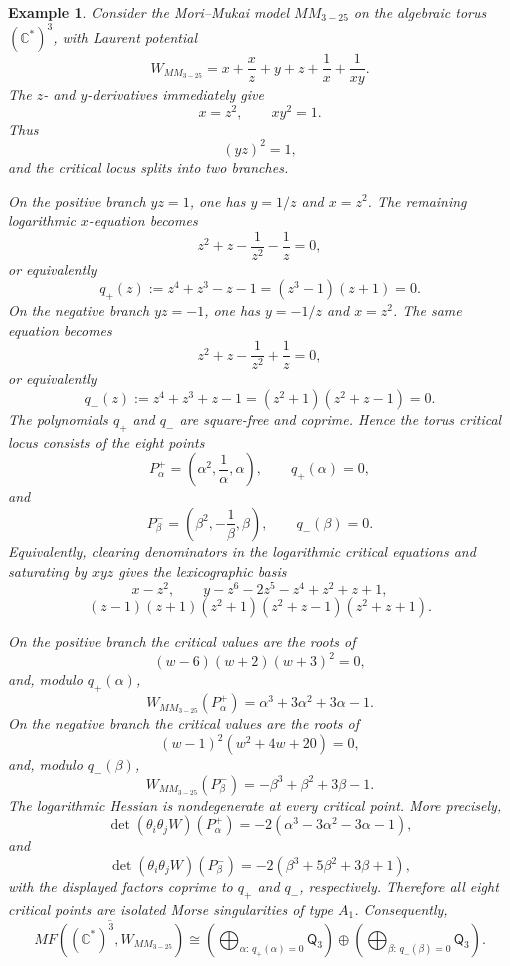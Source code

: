\documentclass[11pt]{amsart}
\newtheorem{example}{Example}[section]
\newcommand{\MorseCat}[1]{\mathsf{Q}_{#1}}
\begin{document}
\begin{example}
Consider the Mori--Mukai model $MM_{3-25}$ on the algebraic torus
$(\mathbb{C}^*)^3$, with Laurent potential
\[
W_{MM_{3-25}}=x+\frac{x}{z}+y+z+\frac{1}{x}+\frac{1}{xy}.
\]
The $z$- and $y$-derivatives immediately give
\[
x=z^2,
\qquad
xy^2=1.
\]
Thus
\[
(yz)^2=1,
\]
and the critical locus splits into two branches.

On the positive branch $yz=1$, one has $y=1/z$ and $x=z^2$. The remaining
logarithmic $x$-equation becomes
\[
z^2+z-\frac{1}{z^2}-\frac{1}{z}=0,
\]
or equivalently
\[
q_+(z):=z^4+z^3-z-1=(z^3-1)(z+1)=0.
\]
On the negative branch $yz=-1$, one has $y=-1/z$ and $x=z^2$. The same equation
becomes
\[
z^2+z-\frac{1}{z^2}+\frac{1}{z}=0,
\]
or equivalently
\[
q_-(z):=z^4+z^3+z-1=(z^2+1)(z^2+z-1)=0.
\]
The polynomials $q_+$ and $q_-$ are square-free and coprime. Hence the torus
critical locus consists of the eight points
\[
P^+_\alpha=\left(\alpha^2,\frac{1}{\alpha},\alpha\right),
\qquad q_+(\alpha)=0,
\]
and
\[
P^-_\beta=\left(\beta^2,-\frac{1}{\beta},\beta\right),
\qquad q_-(\beta)=0.
\]
Equivalently, clearing denominators in the logarithmic critical equations and
saturating by $xyz$ gives the lexicographic basis
\[
x-z^2,
\qquad
y-z^6-2z^5-z^4+z^2+z+1,
\]
\[
(z-1)(z+1)(z^2+1)(z^2+z-1)(z^2+z+1).
\]

On the positive branch the critical values are the roots of
\[
(w-6)(w+2)(w+3)^2=0,
\]
and, modulo $q_+(\alpha)$,
\[
W_{MM_{3-25}}(P^+_\alpha)=\alpha^3+3\alpha^2+3\alpha-1.
\]
On the negative branch the critical values are the roots of
\[
(w-1)^2(w^2+4w+20)=0,
\]
and, modulo $q_-(\beta)$,
\[
W_{MM_{3-25}}(P^-_\beta)=-\beta^3+\beta^2+3\beta-1.
\]
The logarithmic Hessian is nondegenerate at every critical point. More
precisely,
\[
\det(\theta_i\theta_jW)(P^+_\alpha)
=-2(\alpha^3-3\alpha^2-3\alpha-1),
\]
and
\[
\det(\theta_i\theta_jW)(P^-_\beta)
=-2(\beta^3+5\beta^2+3\beta+1),
\]
with the displayed factors coprime to $q_+$ and $q_-$, respectively. Therefore
all eight critical points are isolated Morse singularities of type $A_1$.
Consequently,
\[
\overline{MF((\mathbb{C}^*)^3,W_{MM_{3-25}})}
\cong \left(\bigoplus_{\alpha:\,q_+(\alpha)=0}\MorseCat{3}\right) \oplus \left(\bigoplus_{\beta:\,q_-(\beta)=0}\MorseCat{3}\right).
\]
\end{example}
\end{document}
